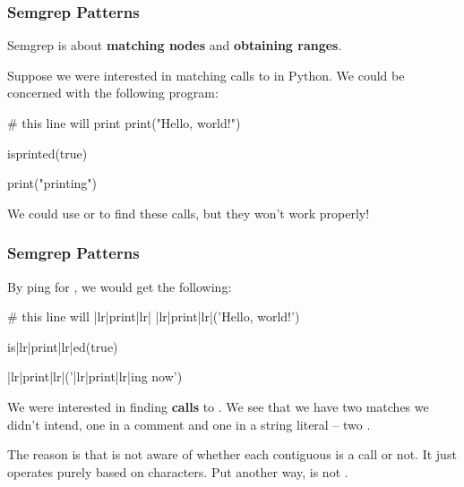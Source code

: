 \documentclass[aspectratio=169, handout]{beamer}
\begin{document}
\begin{frame}[fragile]
  \frametitle{Semgrep Patterns}

  Semgrep is about \textbf{matching nodes} and \textbf{obtaining ranges}.

  \vspace{\fill}

  Suppose we were interested in matching calls to  in Python. We could
  be concerned with the following program:

  \vspace{5pt}

  \begin{pythoncodeblock}
    # this line will print
    print("Hello, world!")

    isprinted(true)

    print("printing")
  \end{pythoncodeblock}

  \vspace{\fill}

  We could use  or  to find these calls, but they won't
  work properly!
\end{frame}


\begin{frame}[fragile]
  \frametitle{Semgrep Patterns}

  By ping for , we would get the following:

  \vspace{5pt}

  \begin{codeblock}
    # this line will |lr|print|lr|
    |lr|print|lr|('Hello, world!')

    is|lr|print|lr|ed(true)

    |lr|print|lr|('|lr|print|lr|ing now')
  \end{codeblock}

  \vspace{\fill}

  We were interested in finding \textbf{calls} to . We see
  that we have two matches we didn't intend, one in a comment and one in
  a string literal -- two .

  \vspace{\fill}

  The reason is that  is not aware of whether each contiguous 
  is a call or not. It just operates purely based on characters. Put another way,
   is not .
\end{frame}
\end{document}
